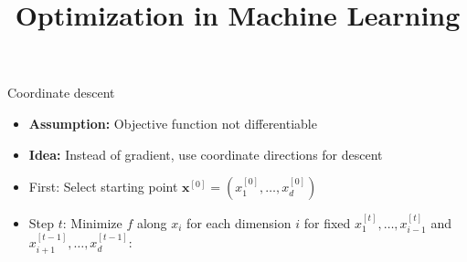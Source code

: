 \documentclass[11pt,compress,t,notes=noshow, xcolor=table]{beamer}
\title{Optimization in Machine Learning}
\date{}
\begin{document}
\sloppy


\begin{vbframe}{Coordinate descent}

\begin{itemize}
    \item \textbf{Assumption:} Objective function not differentiable
    \item \textbf{Idea:} Instead of gradient, use coordinate directions for descent
\end{itemize}


\begin{itemize}
\item First: Select starting point $\bm{x}^{[0]} = (x^{[0]}_1, \ldots, x^{[0]}_d)$
\item Step $t$: Minimize $f$ along $x_i$ for each dimension $i$ for fixed $x^{[t]}_1, \ldots,x^{[t]}_{i-1}$ and $x^{[t-1]}_{i+1}, \ldots,x^{[t-1]}_d$:
\end{itemize}

\vspace{-0.5\baselineskip}


\end{vbframe}
\end{document}

